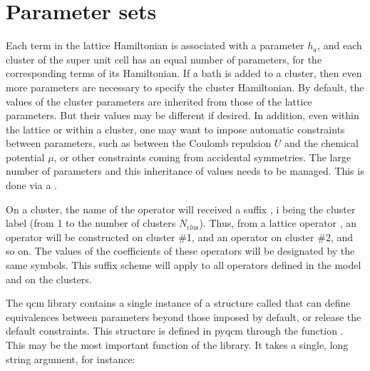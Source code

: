 \documentclass[letterpaper,10pt,english]{sphinxmanual}
\begin{document}
\section{Parameter sets}
\label{\detokenize{parameters:parameter-sets}}
\sphinxAtStartPar
Each term in the lattice Hamiltonian is associated with a parameter \(h_a\), and each cluster of the super unit cell has an equal number of parameters, for the corresponding terms of its Hamiltonian. If a bath is added to a cluster, then even more parameters are necessary to specify the cluster Hamiltonian. By default, the values of the cluster parameters are inherited from those of the lattice parameters. But their values may be different if desired.
In addition, even within the lattice or within a cluster, one may want to impose automatic constraints between parameters, such as between the Coulomb repulsion \(U\) and the chemical potential \(\mu\), or other constraints coming from accidental symmetries.
The large number of parameters and this inheritance of values needs to be managed. This is done via a .

\sphinxAtStartPar
On a cluster, the name of the operator will received a suffix , i being the cluster label (from 1 to the number of clusters \(N_\mathrm{clus}\)). Thus, from a lattice operator , an operator  will be constructed on cluster \#1, and an operator  on cluster \#2, and so on. The values of the coefficients of these operators will be designated by the same symbols. This suffix scheme will apply to all operators defined in the model and on the clusters.

\sphinxAtStartPar
The qcm library contains a single instance of a structure called  that can define equivalences between parameters beyond those imposed by default, or release the default constraints. This structure is defined in pyqcm through the function .
This may be the most important function of the library. It takes a single, long string argument, for instance:

\begin{sphinxVerbatim}[commandchars=\\\{\}]
\end{sphinxVerbatim}
\end{document}
